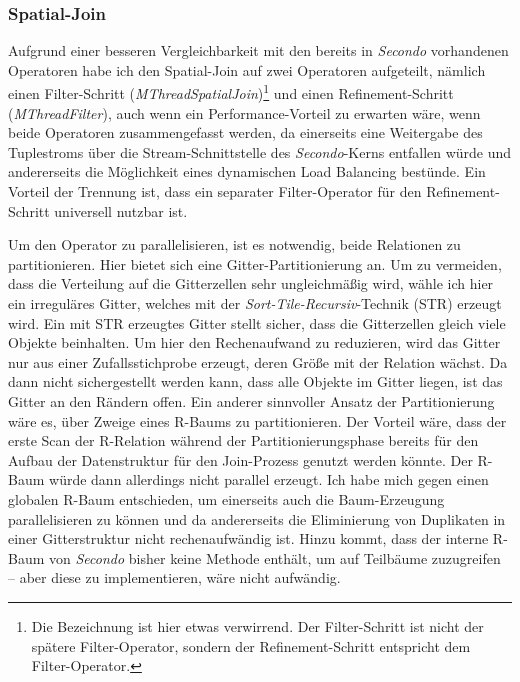 \documentclass[a4paper,12pt,twoside]{article}
\newcommand{\Fb}[1]{\textit{#1}} %
\begin{document}
\subsubsection{Spatial-Join}
\label{entw:spatial}

Aufgrund einer besseren Vergleichbarkeit mit den bereits in \Fb{Secondo} vorhandenen Operatoren habe ich den Spatial-Join auf zwei Operatoren aufgeteilt, nämlich einen Filter-Schritt (\Fb{MThreadSpatialJoin})\footnote{Die Bezeichnung ist hier etwas verwirrend. Der Filter-Schritt ist nicht der spätere Filter-Operator, sondern der Refinement-Schritt entspricht dem Filter-Operator.} und einen Refinement-Schritt (\Fb{MThreadFilter}), auch wenn ein Performance-Vorteil zu erwarten wäre, wenn beide Operatoren zusammengefasst werden, da einerseits eine Weitergabe des Tuplestroms über die Stream-Schnittstelle des \Fb{Secondo}-Kerns entfallen würde und andererseits die Möglichkeit eines dynamischen Load Balancing bestünde. Ein Vorteil der Trennung ist, dass ein separater Filter-Operator für den Refinement-Schritt universell nutzbar ist.

Um den Operator zu parallelisieren, ist es notwendig, beide Relationen zu partitionieren. Hier bietet sich eine Gitter-Partitionierung an. Um zu vermeiden, dass die Verteilung auf die Gitterzellen sehr ungleichmäßig wird, wähle ich hier ein irreguläres Gitter, welches mit der \Fb{Sort-Tile-Recursiv}-Technik (STR) erzeugt wird. Ein mit STR erzeugtes Gitter stellt sicher, dass die Gitterzellen gleich viele Objekte beinhalten. Um hier den Rechenaufwand zu reduzieren, wird das Gitter nur aus einer Zufallsstichprobe erzeugt, deren Größe mit der Relation wächst. Da dann nicht sichergestellt werden kann, dass alle Objekte im Gitter liegen, ist das Gitter an den Rändern offen. Ein anderer sinnvoller Ansatz der Partitionierung wäre es, über Zweige eines R-Baums zu partitionieren. Der Vorteil wäre, dass der erste Scan der R-Relation während der Partitionierungsphase bereits für den Aufbau der Datenstruktur für den Join-Prozess genutzt werden könnte. Der R-Baum würde dann allerdings nicht parallel erzeugt. Ich habe mich gegen einen globalen R-Baum entschieden, um einerseits auch die Baum-Erzeugung parallelisieren zu können und da andererseits die Eliminierung von Duplikaten in einer Gitterstruktur nicht rechenaufwändig ist. Hinzu kommt, dass der interne R-Baum von \Fb{Secondo} bisher keine Methode enthält, um auf Teilbäume zuzugreifen -- aber diese zu implementieren, wäre nicht aufwändig.
\end{document}
